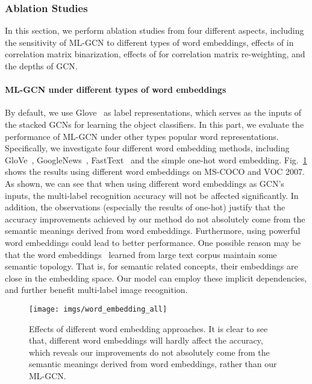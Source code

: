 \documentclass[10pt,twocolumn,letterpaper]{article}
\begin{document}
\subsubsection{Ablation Studies}

In this section, we perform ablation studies from four different aspects, including the sensitivity of ML-GCN to different types of word embeddings, effects of  in correlation matrix binarization, effects of  for correlation matrix re-weighting, and the depths of GCN. 


\paragraph{ML-GCN under different types of word embeddings}

By default, we use Glove~\cite{glove} as label representations, which serves as the inputs of the stacked GCNs for learning the object classifiers. In this part, we evaluate the performance of ML-GCN under other types popular word representations. Specifically, we investigate four different word embedding methods, including GloVe~\cite{glove}, GoogleNews~\cite{googlenews}, FastText~\cite{fasttext} and the simple one-hot word embedding. Fig.~\ref{fig:word} shows the results using different word embeddings on MS-COCO and VOC 2007. As shown, we can see that when using different word embeddings as GCN's inputs, the multi-label recognition accuracy will not be affected significantly. In addition, the observations (especially the results of one-hot) justify that the accuracy improvements achieved by our method do not absolutely come from the semantic meanings derived from word embeddings. Furthermore, using powerful word embeddings could lead to better performance. One possible reason may be that the word embeddings~\cite{glove,googlenews,fasttext} learned from large text corpus maintain some semantic topology. That is, for semantic related concepts, their embeddings are close in the embedding space. Our model can employ these implicit dependencies, and further benefit multi-label image recognition. 



\begin{figure}[t]
	\centering
	\texttt{[image: imgs/word\_embedding\_all]}
	\caption{Effects of different word embedding approaches. It is clear to see that, different word embeddings will hardly affect the accuracy, which reveals our improvements do not absolutely come from the semantic meanings derived from word embeddings, rather than our ML-GCN.}
	\label{fig:word}
\end{figure}
\end{document}
